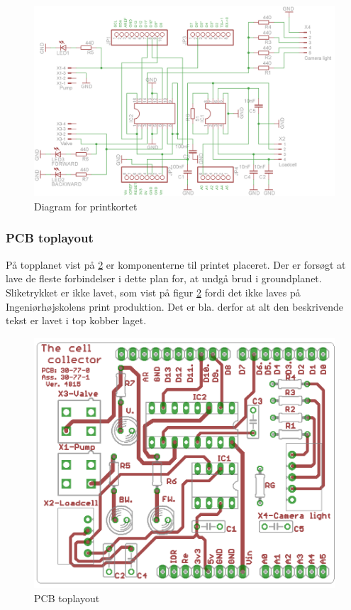 \begin{figure}[H]

	\centering
	\includegraphics[width=1\textwidth]{billeder/hardware/Diagram.png}
	\caption{Diagram for printkortet}
	\label{fig:PCBdiagram}
\end{figure}

\newpage
\subsubsection{PCB toplayout}
På topplanet vist på \ref{fig:PCBtoplayout} er komponenterne til printet placeret. Der er forsøgt at lave de fleste forbindelser i dette plan for, at undgå brud i groundplanet. Sliketrykket er ikke lavet, som vist på figur \ref{fig:PCBtoplayout} fordi det ikke laves på Ingeniørhøjskolens print produktion. Det er bla. derfor at alt den beskrivende tekst er lavet i top kobber laget. 

\begin{figure}[H]
	\centering
	\includegraphics[width=1\textwidth]{billeder/hardware/Toplayout.png}
	\caption{PCB toplayout}
	\label{fig:PCBtoplayout}
\end{figure}


